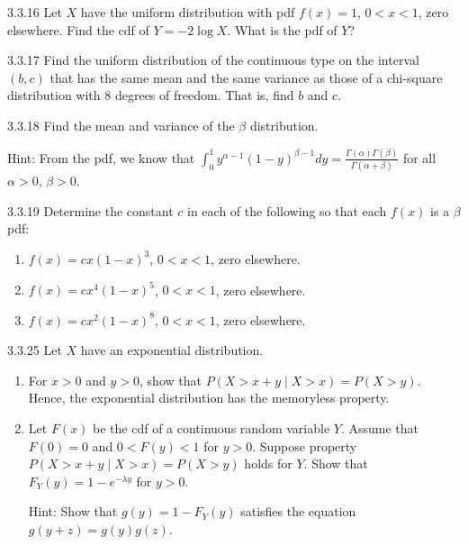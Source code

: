 \begin{exercise}{3.3.16}
Let $X$ have the uniform distribution with pdf $f(x) = 1$, $0 < x < 1$, zero elsewhere. Find the cdf of $Y = -2\log X$. What is the pdf of $Y$?
\end{exercise}

\begin{exercise}{3.3.17}
Find the uniform distribution of the continuous type on the interval $(b, c)$ that has the same mean and the same variance as those of a chi-square distribution with 8 degrees of freedom. That is, find $b$ and $c$.
\end{exercise}

\begin{exercise}{3.3.18}
Find the mean and variance of the $\beta$ distribution.

Hint: From the pdf, we know that $\int_0^1 y^{\alpha-1}(1-y)^{\beta-1}dy = \frac{\Gamma(\alpha)\Gamma(\beta)}{\Gamma(\alpha+\beta)}$ for all $\alpha > 0$, $\beta > 0$.
\end{exercise}

\begin{exercise}{3.3.19}
Determine the constant $c$ in each of the following so that each $f(x)$ is a $\beta$ pdf:
\begin{enumerate}
\item $f(x) = cx(1-x)^3$, $0 < x < 1$, zero elsewhere.
\item $f(x) = cx^4(1-x)^5$, $0 < x < 1$, zero elsewhere.
\item $f(x) = cx^2(1-x)^8$, $0 < x < 1$, zero elsewhere.
\end{enumerate}
\end{exercise}

\begin{exercise}{3.3.25}
Let $X$ have an exponential distribution.
\begin{enumerate}
\item For $x > 0$ and $y > 0$, show that $P(X > x+y \mid X > x) = P(X > y)$. Hence, the exponential distribution has the memoryless property.
\item Let $F(x)$ be the cdf of a continuous random variable $Y$. Assume that $F(0) = 0$ and $0 < F(y) < 1$ for $y > 0$. Suppose property $P(X > x+y \mid X > x) = P(X > y)$ holds for $Y$. Show that $F_Y(y) = 1 - e^{-\lambda y}$ for $y > 0$.

Hint: Show that $g(y) = 1 - F_Y(y)$ satisfies the equation $g(y+z) = g(y)g(z)$.
\end{enumerate}
\end{exercise}

